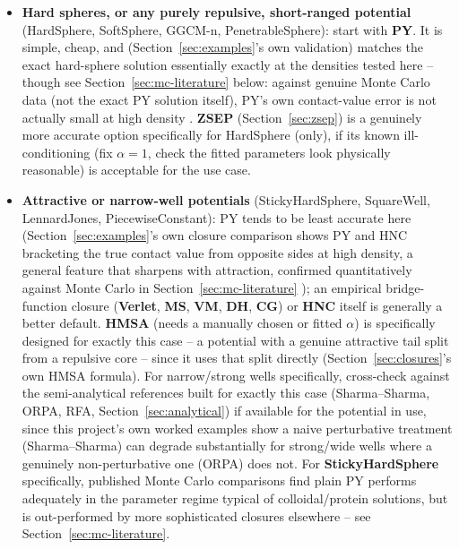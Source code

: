 \documentclass[11pt,a4paper]{article}
\begin{document}
\begin{itemize}[nosep]
  \item \textbf{Hard spheres, or any purely repulsive, short-ranged
    potential} (HardSphere, SoftSphere, GGCM-n, PenetrableSphere): start with
    \textbf{PY}. It is simple, cheap, and (Section~\ref{sec:examples}'s own
    validation) matches the exact hard-sphere solution essentially exactly at
    the densities tested here -- though see Section~\ref{sec:mc-literature}
    below: against genuine Monte Carlo data (not the exact PY solution
    itself), PY's own contact-value error is not actually small at high
    density \cite{pihlajamaa2024}. \textbf{ZSEP} (Section~\ref{sec:zsep}) is a
    genuinely more accurate option specifically for HardSphere (only), if its
    known ill-conditioning (fix $\alpha=1$, check the fitted parameters look
    physically reasonable) is acceptable for the use case.
  \item \textbf{Attractive or narrow-well potentials}
    (StickyHardSphere, SquareWell, LennardJones, PiecewiseConstant):
    PY tends to be least accurate here (Section~\ref{sec:examples}'s own
    closure comparison shows PY and HNC bracketing the true contact value
    from opposite sides at high density, a general feature that sharpens with
    attraction, confirmed quantitatively against Monte Carlo in
    Section~\ref{sec:mc-literature} \cite{pihlajamaa2024}); an empirical
    bridge-function closure (\textbf{Verlet}, \textbf{MS}, \textbf{VM},
    \textbf{DH}, \textbf{CG}) or \textbf{HNC} itself is generally a better
    default. \textbf{HMSA} (needs a manually chosen or fitted $\alpha$) is
    specifically designed for exactly this case -- a potential with a genuine
    attractive tail split from a repulsive core -- since it uses that split
    directly (Section~\ref{sec:closures}'s own HMSA formula). For narrow/strong
    wells specifically, cross-check against the semi-analytical references
    built for exactly this case (Sharma--Sharma, ORPA, RFA,
    Section~\ref{sec:analytical}) if available for the potential in use,
    since this project's own worked examples show a naive perturbative
    treatment (Sharma--Sharma) can degrade substantially for strong/wide
    wells where a genuinely non-perturbative one (ORPA) does not. For
    \textbf{StickyHardSphere} specifically, published Monte Carlo comparisons
    \cite{gazzillo2004} find plain PY performs adequately in the parameter
    regime typical of colloidal/protein solutions, but is out-performed by
    more sophisticated closures elsewhere -- see
    Section~\ref{sec:mc-literature}.

\end{itemize}
\end{document}
